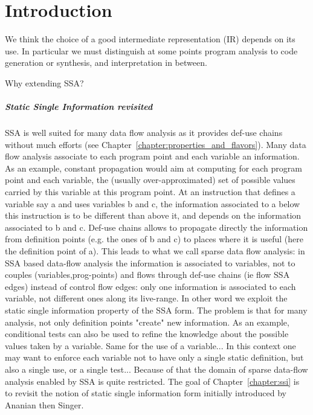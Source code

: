 \chapter{Introduction }


We think the choice of a good intermediate representation (IR) depends on its use. In particular we must distinguish at some points program analysis to code generation or synthesis, and interpretation in between.

Why extending SSA?

\paragraph{Static Single Information revisited}
SSA is well suited for many data flow analysis as it provides def-use chains without much efforts (see Chapter~\ref{chapter:properties_and_flavors}). Many data flow analysis associate to each program point and each variable an information. As an example, constant propagation would aim at computing for each program point and each variable, the (usually over-approximated) set of possible values carried by this variable at this program point. At an instruction that defines a variable say a and uses variables b and c, the information associated to a below this instruction is to be different than above it, and depends on the information associated to b and c. Def-use chains allows to propagate directly the information from definition points (e.g. the ones of b and c) to places where it is useful (here the definition point of a). This leads to what we call sparse data flow analysis: in SSA based data-flow analysis the information is associated to variables, not to couples (variables,prog-points) and flows through def-use chains (ie flow SSA edges) instead of control flow edges: only one information is associated to each variable, not different ones along its live-range. In other word we exploit the static single information property of the SSA form. The problem is that for many analysis, not only definition points "create" new information. As an example, conditional tests can also be used to refine the knowledge about the possible values taken by a variable. Same for the use of a variable... In this context one may want to enforce each variable not to have only a single static definition, but also a single use, or a single test... Because of that the domain of sparse data-flow analysis enabled by SSA is quite restricted. The goal of Chapter~\ref{chapter:ssi} is to revisit the notion of static single information form initially introduced by Ananian then Singer.


